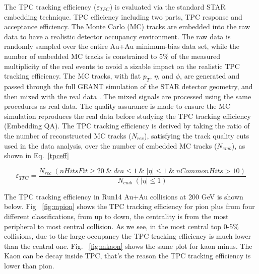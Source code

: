 \documentclass[a4paper]{article}
\begin{document}
The TPC tracking efficiency ($\varepsilon_{TPC}$) is evaluated via the standard STAR embedding technique. TPC efficiency including two parts, TPC response and acceptance efficiency. The Monte Carlo (MC) tracks are embedded into the raw data to have a realistic detector occupancy environment. The raw data is randomly sampled over the entire Au+Au minimum-bias data set, while the number of embedded MC tracks is constrained to 5\% of the measured multiplicity of the real events to avoid a sizable impact on the realistic TPC tracking efficiency. The MC tracks, with flat $p_{T}$, $\eta$, and $\phi$, are generated and passed through the full GEANT simulation of the STAR detector geometry, and then mixed with the real data . The mixed signals are processed using the same procedures as real data.  The quality assurance is made to ensure the MC simulation reproduces the real data before studying the TPC tracking efficiency (Embedding QA). The TPC tracking efficiency is derived by taking the ratio of the number of reconstructed MC tracks ($N_{rec}$), satisfying the track quality cuts used in the data analysis, over the number of embedded MC tracks ($N_{emb}$), as shown in Eq.~\ref{tpceff}

\begin{equation}
\varepsilon_{TPC} = \frac{N_{rec}\;(nHitsFit\geq20\;\&\;dca\leq1\;\&\;|\eta|\leq1\;\&\;nCommonHits > 10)}{N_{emb}\;(|\eta|\leq1)}
\label{tpceff}
\end{equation}

The TPC tracking efficiency in Run14 Au+Au collisions at 200 GeV is shown below. Fig ~\ref{fig:mpion} shows the TPC tracking efficiency for pion plus from four different classifications, from up to down, the centrality is from the most peripheral to most central collision. As we see, in the most central top 0-5\% collisions, due to the large occupancy the TPC tracking efficiency is much lower than the central one. Fig. ~\ref{fig:mkaon} shows the same plot for kaon minus. The Kaon can be decay inside TPC, that's the reason the TPC tracking efficiency is lower than pion.
\end{document}

